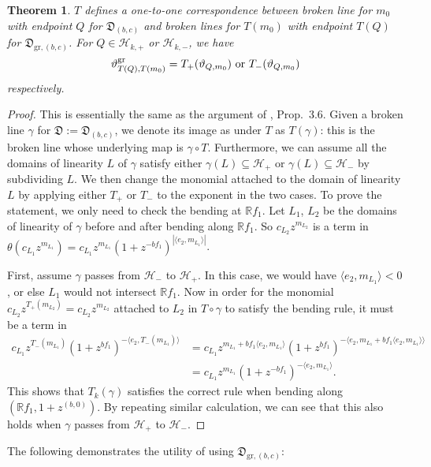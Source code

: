 \documentclass[12pt]{amsart}
\newtheorem{theorem}{Theorem}[section]
\theoremstyle{remark}
\newcommand{\RR}{\mathbb{R}}
\newcommand{\DD}{\mathfrak{D}}
\newcommand{\gr}{\mathrm{gr}}
\begin{document}
\begin{theorem}
$T$ defines a one-to-one correspondence between broken line for $m_0$ with endpoint $Q$ for $\DD_{(b,c)}$ and broken lines for $T(m_0)$ with endpoint $T(Q)$ for $\DD_{\gr,(b,c)}$. For $Q \in \mathcal{H}_{k,+}$ or $\mathcal{H}_{k,-}$, we have
\[ 
\hbox{$\vartheta^{\gr}_{T(Q),T( m_0)} = T_{+} (\vartheta_{Q, m_0})$
or $T_{-} (\vartheta_{Q, m_0})$}\]
respectively.
\end{theorem}

\begin{proof}
This is essentially the same as the argument of \cite{GHKK}, Prop.\ 3.6.
Given a broken line $\gamma$ for $\DD:=\DD_{(b,c)}$, we denote its image as 
under $T$ as $T(\gamma)$: this is the broken line whose underlying map
is $\gamma\circ T$. Furthermore, we can assume all the domains of linearity 
$L$ of $\gamma$ satisfy either $\gamma(L) \subseteq \mathcal{H}_{+} $ or $
\gamma(L)\subseteq \mathcal{H}_{-}$ by subdividing $L$. We then change
the monomial attached to the domain of linearity $L$ by applying either
$T_+$ or $T_-$ to the exponent in the two cases.
To prove the statement, we only need to check the bending at $\RR f_1$. Let $L_1$, $L_2$ be the domains of linearity of $\gamma$ before and after bending along
$\RR f_1$. So $c_{L_2} z^{m_{L_2}}$ is a term in
$\theta (c_{L_1} z^{m_{L_1}}) = c_{L_1} z^{m_{L_1}} (1+z^{-bf_1}) ^{|\langle  e_2, m_{L_1}  \rangle|} $. 

First, assume $\gamma$ passes from $\mathcal{H}_-$ to $\mathcal{H}_+$. In this case, we would have $\langle e_2 , m_{L_1} \rangle < 0$, or else $L_1$ would
not intersect $\RR f_1$. Now in order for the monomial $c_{L_2}z^{T_+(m_{L_2})}
=c_{L_2}z^{m_{L_2}}$
attached to $L_2$
in $T\circ\gamma$ to satisfy the bending rule, it must be a term in
\begin{align*} 
c_{L_1} z^{T_-(m_{L_1})} (1+z^{bf_1}) ^{-\langle  e_2, T_-(m_{L_1}) \rangle} & =
c_{L_1} z^{m_{L_1}+bf_1\langle e_2, m_{L_1}\rangle} (1+z^{bf_1}) ^{-\langle  e_2, 
m_{L_1}+bf_1\langle e_2, m_{L_1} \rangle \rangle} \\
& = c_{L_1} z^{m_{L_1}} (1+z^{-bf_1}) ^{-\langle  e_2, m_{L_1}  \rangle}.
\end{align*}
This shows that $T_k(\gamma)$ satisfies the correct rule when bending along
$(\RR f_1, 1+z^{(b,0)})$. By repeating similar calculation, we can see that this also holds when $\gamma$ passes from $\mathcal{H}_+$ to $\mathcal{H}_-$.
\end{proof}

The following demonstrates the utility of using $\DD_{\gr,(b,c)}$:
\end{document}
